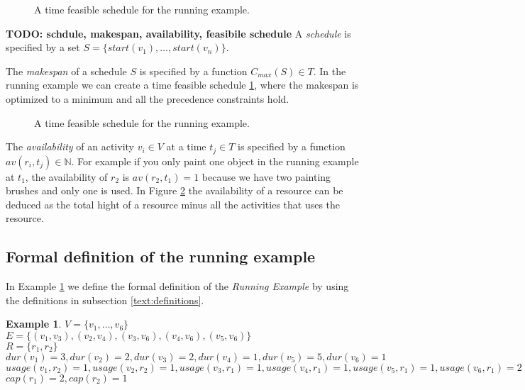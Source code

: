 \documentclass{article}
\theoremstyle{definition}
\newcommand{\TODO}[1]{{\color{red}\textbf{TODO: #1}}}
\newtheorem{example}{Example}[section]
\newcommand{\av}[2]{\ensuremath{av(r_{#1}, t_{#2})}} %
\newcommand{\capa}[1]{\ensuremath{cap(r_{#1})}} %
\newcommand{\dur}[1]{\ensuremath{dur(v_{#1})}} %
\newcommand{\usage}[2]{\ensuremath{usage(v_{#1}, r_{#2})}} %
\newcommand{\start}[1]{\ensuremath{start(v_{#1})}} %
\newcommand{\makespan}[1]{\ensuremath{C_{max}(#1)}} %
\begin{document}
\begin{figure}[h]
	\centering
	
	\caption{A time feasible schedule for the running example. }
	\label{fig:time_feasible_schedule}
\end{figure}

\TODO{schdule, makespan, availability, feasibile schedule}
A \emph{schedule} is specified by a set $S = \{\start{1}, \ldots, \start{n}\}$.

The \emph{makespan} of a schedule $S$ is specified by a function $\makespan{S} \in T$.
In the running example we can create a time feasible schedule \ref{fig:time_feasible_schedule}, where the makespan is optimized to a minimum and all the precedence constraints hold.

\begin{figure}[h]
	\centering
	
	\caption{A time feasible schedule for the running example. }
	\label{fig:feasible_schedule}
\end{figure}

The \emph{availability} of an activity $v_i \in V$ at a time $t_j \in T$ is specified by a function $\av{i}{j} \in \mathbb{N}$.
For example if you only paint one object in the running example at $t_1$, the availability of $r_2$ is $\av{2}{1} = 1$ because we have two painting brushes and only one is used.
In Figure \ref{fig:feasible_schedule} the availability of a resource can be deduced as the total hight of a resource minus all the activities that uses the resource.

\subsection{Formal definition of the running example}

In Example \ref{exmp:running} we define the formal definition of the \emph{Running Example} by using the definitions in subsection \ref{text:definitions}.
\begin{example}
\label{exmp:running}
$V = \{v_1, \ldots, v_6\}$\\
$E = \{(v_1, v_3), (v_2, v_4), (v_3, v_6), (v_4, v_6), (v_5, v_6)\}$\\
$R = \{r_1, r_2\}$\\
$\dur{1} = 3, \dur{2} = 2, \dur{3} = 2, \dur{4} = 1, \dur{5} = 5, \dur{6} = 1$\\
$\usage{1}{2} = 1, \usage{2}{2} = 1, \usage{3}{1} = 1, \usage{4}{1} = 1, \usage{5}{1} = 1, \usage{6}{1} = 2$\\
$\capa{1} = 2, \capa{2} = 1$
\end{example}
\end{document}
